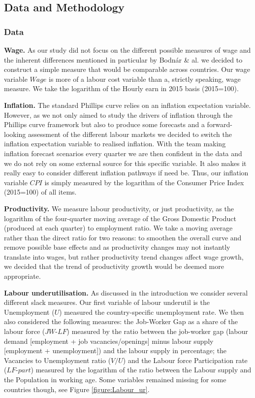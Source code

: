 \subsection{Data and Methodology}
\subsubsection{Data}

\quad \textbf{Wage.} As our study did not focus on the different possible measures of wage and the inherent differences mentioned in particular by Bodnár \& al.\cite{labour7} we decided to construct a simple measure that would be comparable across countries. 
Our wage variable $Wage$ is more of a labour cost variable than a, strictly speaking, wage measure. We take the logarithm of the Hourly earn in 2015 basis (2015=100). 

\textbf{Inflation.} The standard Phillips curve relies on an inflation expectation variable. 
However, as we not only aimed to study the drivers of inflation through the Phillips curve framework but also to produce some forecasts and a forward-looking assessment of the different labour markets we decided to switch the inflation expectation variable to realised inflation. 
With the team making inflation forecast scenarios every quarter we are then confident in the data and we do not rely on some external source for this specific variable. 
It also makes it really easy to consider different inflation pathways if need be. 
Thus, our inflation variable $CPI$ is simply measured by the logarithm of the Consumer Price Index (2015=100) of all items.

\textbf{Productivity.} We measure labour productivity, or just productivity, as the logarithm of the four-quarter moving average of the Gross Domestic Product (produced at each quarter) to employment ratio. 
We take a moving average rather than the direct ratio for two reasons: to smoothen the overall curve and remove possible base effects and as productivity changes may not instantly translate into wages, but rather productivity trend changes affect wage growth, we decided that the trend of productivity growth would be deemed more appropriate.

\textbf{Labour underutilisation.} As discussed in the introduction we consider several different slack measures. 
Our first variable of labour underutil is the Unemployment ($U$) measured the country-specific unemployment rate. 
We then also considered the following measures: the Job-Worker Gap as a share of the labour force ($JW\textrm{-}LF$) measured by the ratio between the job-worker gap (labour demand [employment + job vacancies/openings] minus labour supply [employment + unemployment]) and the labour supply in percentage; the Vacancies to Unemployment ratio ($V/U$) and the Labour force Participation rate ($LF\textrm{-}part$) measured by the logarithm of the ratio between the Labour supply and the Population in working age.
Some variables remained missing for some countries though, see Figure \ref{figure:Labour_ur}.


